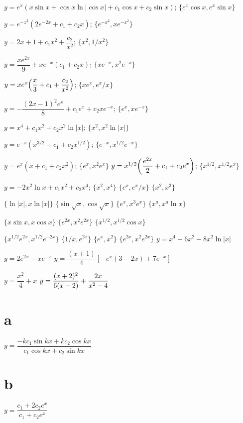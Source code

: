  $y=e^x(x\sin x+\cos x\ln|\cos x|+c_1\cos x+c_2\sin x)$;\;
$\{e^x\cos x,e^x\sin x\}$

 $y=e^{-x^2}(2e^{-2x}+c_1+c_2x)$;\;
$\{e^{-x^2},xe^{-x^2}\}$

 $y=2x+1+c_1x^2+\dfrac{c_2}{x^2}$;\;
$\{x^2,1/x^2\}$

 $y=\dfrac{xe^{2x}}{9}+xe^{-x}(c_1+c_2x)$;\;
$\{xe^{-x},x^2e^{-x}\}$

$y=xe^x\displaystyle{\left(\frac{x}{3}+c_1+\frac{c_2}{x^2}\right)}$;\;
$\{xe^x,e^x/x\}$

$y=-\dfrac{(2x-1)^2e^x}{8}+c_1e^x+c_2xe^{-x}$;\;
$\{e^x,xe^{-x}\}$

$y=x^4+c_1x^2+c_2x^2\ln|x|$;\;    $\{x^2,x^2\ln|x|\}$

 $y=e^{-x}(x^{3/2}+c_1+c_2x^{1/2})$; \;
$\{e^{-x},x^{1/2}e^{-x}\}$

 $y=e^x(x+c_1+c_2x^2)$;\;   $\{e^x,x^2e^x\}$
 $y=x^{1/2}\displaystyle{\left(\frac{e^{2x}}{2}+c_1+c_2e^x\right)}$;\;
$\{x^{1/2},x^{1/2}e^x\}$

$y=-2x^2\ln x+c_1x^2+c_2x^4$;\;   $\{x^2,x^4\}$
 $\{e^x,e^x/x\}$
 $\{x^2,x^3\}$

 $\{\ln|x|,x \ln|x|\}$
 $\{\sin\sqrt x,\cos \sqrt{x}\}$
 $\{e^x,x^3e^x\}$
 $\{x^a,x^a\ln x\}$

 $\{x\sin x,x\cos x\}$
 $\{e^{2x},x^2e^{2x}\}$
 $\{x^{1/2},x^{1/2}\cos x\}$

 $\{x^{1/2}e^{2x},x^{1/2}e^{-2x}\}$
 $\{1/x,e^{2x}\}$
   $\{e^x,x^2\}$
 $\{e^{2x},x^2e^{2x}\}$
 $y=x^4+6x^2-8x^2\ln|x|$

 $y=2e^{2x}-xe^{-x}$
$y=\dfrac{(x+1)}{4}\left[-e^x(3-2x)+7e^{-x}\right]$

 $y=\dfrac{x^2}{4}+x$
$y=\displaystyle{\frac{(x+2)^2}{6(x-2)}+\frac{2x}{x^2-4}}$

\part{a} $y=\dfrac{-kc_1\sin kx+kc_2\cos kx}{c_1\cos kx+c_2\sin kx}$
\;  \part{b} $y=\dfrac{c_1+2c_2e^x}{c_1+c_2e^x}$\\ [2\jot]
